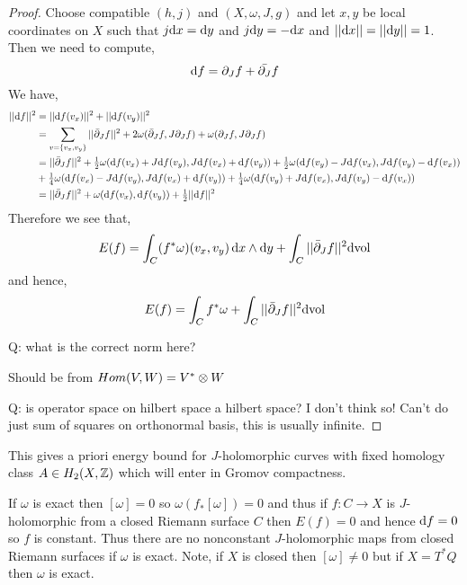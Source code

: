 \documentclass[12pt]{article}
\begin{document}
\begin{proof}
Choose compatible $(h, j)$ and $(X, \omega, J, g)$ and let $x,y$ be local coordinates on $X$ such that $j \mathrm{d}{x} = \mathrm{d}{y}$ and $j \mathrm{d}{y} = - \mathrm{d}{x}$ and $|| \mathrm{d}{x} || = || \mathrm{d}{y} || = 1$. Then we need to compute,
\[ \mathrm{d}{f} = \partial_J f + \bar{\partial_J} f \]
We have,
\begin{align*}
|| \mathrm{d}{f} ||^2 & = || \mathrm{d}{f}(v_x) ||^2 + || \mathrm{d}{f}(v_y) ||^2 
\\
& = \sum_{v = \{ v_x, v_y \}} || \bar{\partial}_J f ||^2 + 2 \omega(\bar{\partial}_J f, J \partial_J f) + \omega(\partial_J f, J \partial_J f)
\\
& = || \bar{\partial}_J f ||^2 + \tfrac{1}{2} \omega(\mathrm{d}{f}(v_x) + J \mathrm{d}{f}(v_y), J \mathrm{d}{f}(v_x) + \mathrm{d}{f}(v_y)) + \tfrac{1}{2} \omega(\mathrm{d}{f}(v_y) - J \mathrm{d}{f}(v_x), J \mathrm{d}{f}(v_y) - \mathrm{d}{f}(v_x)) 
\\
& + \tfrac{1}{4} \omega(\mathrm{d}{f}(v_x) - J \mathrm{d}{f}(v_y), J \mathrm{d}{f}(v_x) + \mathrm{d}{f}(v_y)) + \tfrac{1}{4} \omega(\mathrm{d}{f}(v_y) + J \mathrm{d}{f}(v_x), J \mathrm{d}{f}(v_y) - \mathrm{d}{f}(v_x))
\\
& = || \bar{\partial}_J f ||^2 + \omega(\mathrm{d}{f}(v_x), \mathrm{d}{f}(v_y)) + \tfrac{1}{2} || \mathrm{d}{f} ||^2
\end{align*}
Therefore we see that,
\[ E(f) = \int_C (f^* \omega)(v_x, v_y) \, \mathrm{d}{x} \wedge \mathrm{d}{y} + \int_C || \bar{\partial}_J f ||^2 \mathrm{d}{\mathrm{vol}} \]
and hence,
\[ E(f) = \int_C f^* \omega + \int_C || \bar{\partial}_J f ||^2 \mathrm{d}{\mathrm{vol}} \]


Q: what is the correct norm here?

Should be from $Hom(V, W) = V^* \otimes W$

Q: is operator space on hilbert space a hilbert space? I don't think so! Can't do just sum of squares on orthonormal basis, this is usually infinite. 
\end{proof}

\begin{rmk}
This gives a priori energy bound for $J$-holomorphic curves with fixed homology class $A \in H_2(X, \mathbb{Z})$ which will enter in Gromov compactness.  
\end{rmk}

\begin{rmk}
If $\omega$ is exact then $[\omega] = 0$ so $\omega(f_* [\omega]) = 0$ and thus if $f : C \to X$ is $J$-holomorphic from a closed Riemann surface $C$ then $E(f) = 0$ and hence $\mathrm{d}{f} = 0$ so $f$ is constant. Thus there are no nonconstant $J$-holomorphic maps from closed Riemann surfaces if $\omega$ is exact. Note, if $X$ is closed then $[\omega] \neq 0$ but if $X = T^* Q$ then $\omega$ is exact. 
\end{rmk}
\end{document}
